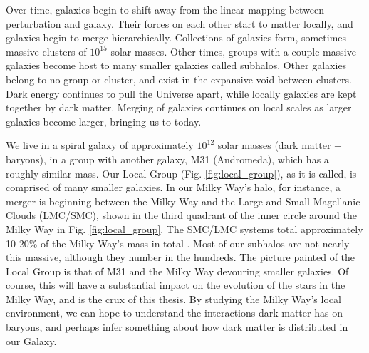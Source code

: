 Over time, galaxies begin to shift away from the linear mapping between perturbation and galaxy. Their forces on each other start to matter locally, and galaxies begin to merge hierarchically. Collections of galaxies form, sometimes massive clusters of $10^{15}$ solar masses. Other times, groups with a couple massive galaxies become host to many smaller galaxies called subhalos. Other galaxies belong to no group or cluster, and exist in the expansive void between clusters. Dark energy continues to pull the Universe apart, while locally galaxies are kept together by dark matter. Merging of galaxies continues on local scales as larger galaxies become larger, bringing us to today.

We live in a spiral galaxy of approximately $10^{12}$ solar masses (dark matter + baryons), in a group with another galaxy, M31 (Andromeda), which has a roughly similar mass. Our Local Group (Fig. \ref{fig:local_group}), as it is called, is comprised of many smaller galaxies. In our Milky Way's halo, for instance, a merger is beginning between the Milky Way and the Large and Small Magellanic Clouds (LMC/SMC), shown in the third quadrant of the inner circle around the Milky Way in Fig. \ref{fig:local_group}. The SMC/LMC systems total approximately 10-20\% of the Milky Way's mass in total \citep{erkal_lmc}. Most of our subhalos are not nearly this massive, although they number in the hundreds. The picture painted of the Local Group is that of M31 and the Milky Way devouring smaller galaxies. Of course, this will have a substantial impact on the evolution of the stars in the Milky Way, and is the crux of this thesis. By studying the Milky Way's local environment, we can hope to understand the interactions dark matter has on baryons, and perhaps infer something about how dark matter is distributed in our Galaxy.






